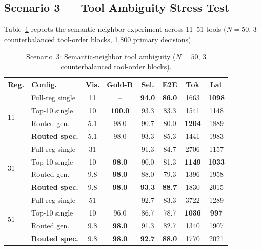 \subsection{Scenario 3 --- Tool Ambiguity Stress Test}
\label{sec:s3_results}

Table~\ref{tab:tool_ambiguity} reports the semantic-neighbor experiment across 11--51 tools ($N{=}50$, 3 counterbalanced tool-order blocks, 1,800 primary decisions).

\begin{table}[!htb]
\centering
\caption{Scenario~3: Semantic-neighbor tool ambiguity ($N=50$, 3 counterbalanced tool-order blocks).}
\label{tab:tool_ambiguity}
{\small\setlength{\tabcolsep}{2.5pt}
\begin{tabular}{llcccccc}
\toprule
\textbf{Reg.} & \textbf{Config.} & \textbf{Vis.} & \textbf{Gold-R} & \textbf{Sel.} & \textbf{E2E} & \textbf{Tok} & \textbf{Lat} \\
\midrule
\multirow{4}{*}{11} & Full-reg single & 11 & -- & \textbf{94.0} & \textbf{86.0} & 1663 & \textbf{1098} \\
 & Top-10 single   & 10 & \textbf{100.0} & 93.3 & 83.3 & 1541 & 1148 \\
 & Routed gen.     & 5.1 & 98.0 & 90.7 & 80.0 & \textbf{1204} & 1889 \\
 & \textbf{Routed spec.} & 5.1 & 98.0 & 93.3 & 85.3 & 1441 & 1983 \\
\midrule
\multirow{4}{*}{31} & Full-reg single & 31 & -- & 91.3 & 84.7 & 2706 & 1157 \\
 & Top-10 single   & 10 & \textbf{98.0} & 90.0 & 81.3 & \textbf{1149} & \textbf{1033} \\
 & Routed gen.     & 9.8 & \textbf{98.0} & 88.0 & 79.3 & 1396 & 1958 \\
 & \textbf{Routed spec.} & 9.8 & \textbf{98.0} & \textbf{93.3} & \textbf{88.7} & 1830 & 2015 \\
\midrule
\multirow{4}{*}{51} & Full-reg single & 51 & -- & 92.7 & 83.3 & 3722 & 1289 \\
 & Top-10 single   & 10 & 96.0 & 86.7 & 78.7 & \textbf{1036} & \textbf{997} \\
 & Routed gen.     & 9.8 & \textbf{98.0} & 91.3 & 82.7 & 1340 & 1907 \\
 & \textbf{Routed spec.} & 9.8 & \textbf{98.0} & \textbf{92.7} & \textbf{88.0} & 1770 & 2021 \\
\bottomrule
\end{tabular}}
\end{table}

